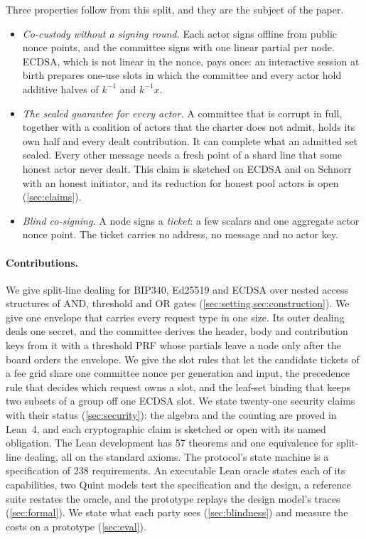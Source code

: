 Three properties follow from this split, and they are the subject of the paper.
\begin{itemize}[leftmargin=1.5em]
\item \emph{Co-custody without a signing round.} Each actor signs offline from public nonce points, and the committee signs with one linear partial per node. ECDSA, which is not linear in the nonce, pays once: an interactive session at birth prepares one-use slots in which the committee and every actor hold additive halves of $k^{-1}$ and $k^{-1}x$.
\item \emph{The sealed guarantee for every actor.} A committee that is corrupt in full, together with a coalition of actors that the charter does not admit, holds its own half and every dealt contribution. It can complete what an admitted set sealed. Every other message needs a fresh point of a shard line that some honest actor never dealt. This claim is sketched on ECDSA and on Schnorr with an honest initiator, and its reduction for honest pool actors is open (\cref{sec:claims}).
\item \emph{Blind co-signing.} A node signs a \emph{ticket}: a few scalars and one aggregate actor nonce point. The ticket carries no address, no message and no actor key.
\end{itemize}

\paragraph{Contributions.} We give split-line dealing for BIP340, Ed25519 and ECDSA over nested access structures of AND, threshold and OR gates (\cref{sec:setting,sec:construction}). We give one envelope that carries every request type in one size. Its outer dealing deals one secret, and the committee derives the header, body and contribution keys from it with a threshold PRF whose partials leave a node only after the board orders the envelope. We give the slot rules that let the candidate tickets of a fee grid share one committee nonce per generation and input, the precedence rule that decides which request owns a slot, and the leaf-set binding that keeps two subsets of a group off one ECDSA slot. We state twenty-one security claims with their status (\cref{sec:security}): the algebra and the counting are proved in Lean~4, and each cryptographic claim is sketched or open with its named obligation. The Lean development has 57 theorems and one equivalence for split-line dealing, all on the standard axioms. The protocol's state machine is a specification of 238 requirements. An executable Lean oracle states each of its capabilities, two Quint models test the specification and the design, a reference suite restates the oracle, and the prototype replays the design model's traces (\cref{sec:formal}). We state what each party sees (\cref{sec:blindness}) and measure the costs on a prototype (\cref{sec:eval}).

